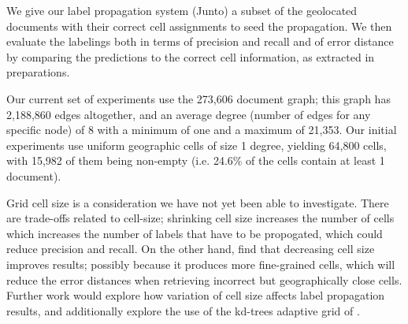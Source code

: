 \par 
We give our label propagation system (Junto) a subset of the geolocated
documents with their correct cell assignments to seed the propagation. We then
evaluate the labelings both in terms of precision and recall and of error
distance by comparing the predictions to the correct cell information, as
extracted in preparations.

\par %
Our current set of experiments use the 273,606
document graph; this graph has  2,188,860 edges altogether, and an average
degree (number of edges for any  specific node) of 8 with a minimum of one and
a maximum of 21,353. Our initial  experiments use uniform geographic cells of
size 1 degree, yielding 64,800  cells, with 15,982 of them being non-empty
(i.e. 24.6\% of the cells contain at  least 1 document).

\par
Grid cell size is a consideration we have not yet been able to investigate.
There are trade-offs related to cell-size; shrinking cell size increases the
number of cells which increases the number of labels that have to be
propogated, which could reduce precision and recall. On the other hand,
 find that decreasing cell size improves results;
possibly because it produces more fine-grained cells, which will reduce the
error distances when retrieving incorrect but geographically close cells.
Further work would explore how variation of cell size affects label propagation
results, and additionally explore the use of the kd-trees adaptive grid of
.


